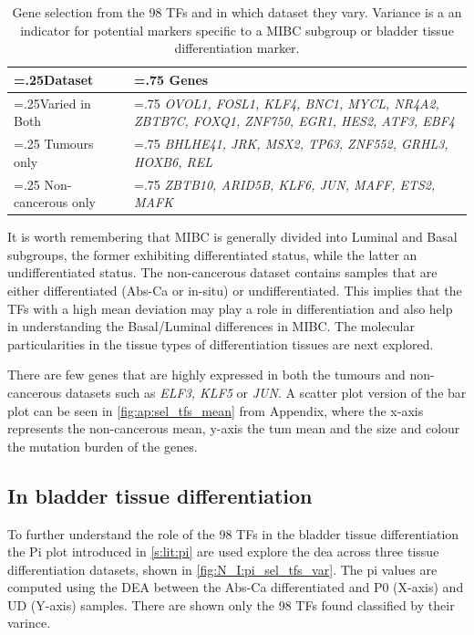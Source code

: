 \begin{table}[!htb]
  \centering
  \scriptsize
  \begin{tabularx}{\textwidth}{>{\hsize=.25\hsize}X|>{\hsize=.75\hsize}X}
    \toprule
    \textbf{Dataset} & \textbf{Genes} \\
    \midrule
    Varied in Both & \textit{OVOL1, FOSL1, KLF4, BNC1, MYCL, NR4A2, ZBTB7C, FOXQ1, ZNF750, EGR1, HES2, ATF3, EBF4} \\
    \midrule
    Tumours only & \textit{BHLHE41, JRK, MSX2, TP63, ZNF552, GRHL3, HOXB6, REL} \\
    \midrule
    Non-cancerous only & \textit{ZBTB10, ARID5B, KLF6, JUN, MAFF, ETS2, MAFK} \\
    \bottomrule
  \end{tabularx}
    \caption{Gene selection from the 98 TFs and in which dataset they vary. Variance is a an indicator for potential markers specific to a MIBC subgroup or bladder tissue differentiation marker.}
    \label{tab:N_I:sel_tfs_var}
\end{table}

It is worth remembering that MIBC is generally divided into Luminal and Basal subgroups, the former exhibiting differentiated status, while the latter an undifferentiated status. The non-cancerous dataset contains samples that are either differentiated (Abs-Ca or in-situ) or undifferentiated. This implies that the TFs with a high mean deviation may play a role in differentiation and also help in understanding the Basal/Luminal differences in MIBC. The molecular particularities in the tissue types of differentiation tissues are next explored.

There are few genes that are highly expressed in both the tumours and non-cancerous datasets such as \textit{ELF3, KLF5} or \textit{JUN}. A scatter plot version of the bar plot can be seen in \cref{fig:ap:sel_tfs_mean} from Appendix, where the x-axis represents the non-cancerous mean, y-axis the tum mean and the size and colour the mutation burden of the genes.

\subsection{In bladder tissue differentiation} \label{s:N:sel_tf_diff_status}


To further understand the role of the 98 TFs in the bladder tissue differentiation the Pi plot introduced in \cref{s:lit:pi} are used explore the \acrfull{dea} across three tissue differentiation datasets, shown in \cref{fig:N_I:pi_sel_tfs_var}. The pi values are computed using the DEA between the Abs-Ca differentiated and P0 (X-axis) and UD (Y-axis) samples. There are shown only the 98 TFs found classified by their varince.


